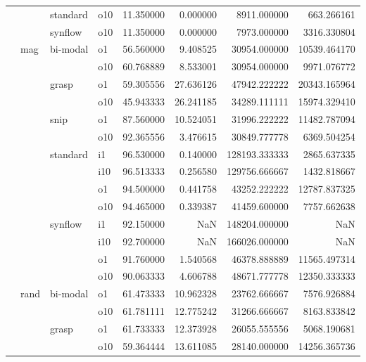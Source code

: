 \begin{longtable}{llllrrrr}
      &     & standard & o10 &  11.350000 &   0.000000 &      8911.000000 &    663.266161 \\
      &     & synflow & o10 &  11.350000 &   0.000000 &      7973.000000 &   3316.330804 \\
      & mag & bi-modal & o1 &  56.560000 &   9.408525 &     30954.000000 &  10539.464170 \\
      &     &         & o10 &  60.768889 &   8.533001 &     30954.000000 &   9971.076772 \\
      &     & grasp & o1 &  59.305556 &  27.636126 &     47942.222222 &  20343.165964 \\
      &     &         & o10 &  45.943333 &  26.241185 &     34289.111111 &  15974.329410 \\
      &     & snip & o1 &  87.560000 &  10.524051 &     31996.222222 &  11482.787094 \\
      &     &         & o10 &  92.365556 &   3.476615 &     30849.777778 &   6369.504254 \\
      &     & standard & i1 &  96.530000 &   0.140000 &    128193.333333 &   2865.637335 \\
      &     &         & i10 &  96.513333 &   0.256580 &    129756.666667 &   1432.818667 \\
      &     &         & o1 &  94.500000 &   0.441758 &     43252.222222 &  12787.837325 \\
      &     &         & o10 &  94.465000 &   0.339387 &     41459.600000 &   7757.662638 \\
      &     & synflow & i1 &  92.150000 &        NaN &    148204.000000 &           NaN \\
      &     &         & i10 &  92.700000 &        NaN &    166026.000000 &           NaN \\
      &     &         & o1 &  91.760000 &   1.540568 &     46378.888889 &  11565.497314 \\
      &     &         & o10 &  90.063333 &   4.606788 &     48671.777778 &  12350.333333 \\
      & rand & bi-modal & o1 &  61.473333 &  10.962328 &     23762.666667 &   7576.926884 \\
      &     &         & o10 &  61.781111 &  12.775242 &     31266.666667 &   8163.833842 \\
      &     & grasp & o1 &  61.733333 &  12.373928 &     26055.555556 &   5068.190681 \\
      &     &         & o10 &  59.364444 &  13.611085 &     28140.000000 &  14256.365736 \\

\end{longtable}

